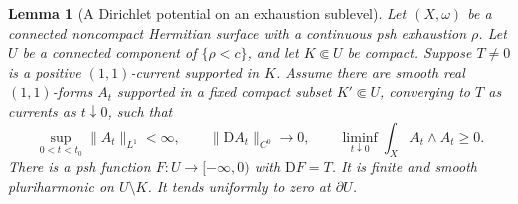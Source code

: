 \documentclass[11pt]{amsart}
\newtheorem{lemma}[theorem]{Lemma}
\theoremstyle{remark}
\numberwithin{equation}{section}
\newcommand{\D}{\mathrm{D}}
\begin{document}
\begin{lemma}[A Dirichlet potential on an exhaustion sublevel]\label{lem:dirichlet}
Let $(X,\omega)$ be a connected noncompact Hermitian surface with a continuous psh
exhaustion $\rho$. Let $U$ be a connected component of $\{\rho<c\}$,
and let $K\Subset U$ be compact. Suppose $T\ne0$ is a positive
$(1,1)$-current supported in $K$. Assume there are smooth real
$(1,1)$-forms $A_t$ supported in a fixed compact subset $K'\Subset U$,
converging to $T$ as currents as $t\downarrow0$, such that
\[
 \sup_{0<t<t_0}\|A_t\|_{L^1}<\infty,\qquad
 \|\D A_t\|_{C^0}\longrightarrow0,\qquad
 \liminf_{t\downarrow0}\int_X A_t\wedge A_t\ge0 .
\]
There is a psh function $F:U\to[-\infty,0)$ with $\D F=T$.
It is finite and smooth pluriharmonic on $U\setminus K$.
It tends uniformly to zero at $\partial U$.
\end{lemma}
\end{document}
